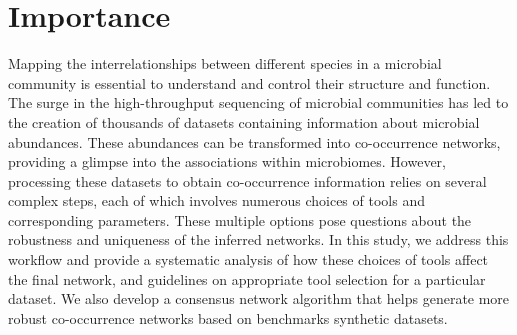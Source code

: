 \section*{Importance}
  Mapping the interrelationships between different species in a microbial community is essential to understand and control their structure and function.
  The surge in the high-throughput sequencing of microbial communities has led to the creation of thousands of datasets containing information about microbial abundances.
  These abundances can be transformed into co-occurrence networks, providing a glimpse into the associations within microbiomes.
  However, processing these datasets to obtain co-occurrence information relies on several complex steps, each of which involves numerous choices of tools and corresponding parameters.
  These multiple options pose questions about the robustness and uniqueness of the inferred networks.
  In this study, we address this workflow and provide a systematic analysis of how these choices of tools affect the final network, and guidelines on appropriate tool selection for a particular dataset.
  We also develop a consensus network algorithm that helps generate more robust co-occurrence networks based on benchmarks synthetic datasets.
